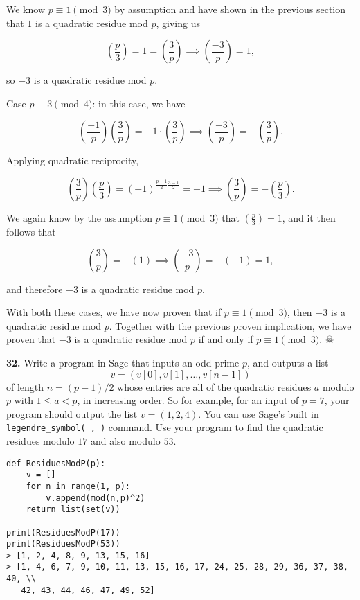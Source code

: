 \documentclass[12pt]{amsart}
\newcommand{\lsym}[2]{\ensuremath{\left(\frac{#1}{#2} \right)}}
\begin{document}
\begin{itemize}
We know $p\equiv 1\pmod{3}$ by assumption and have shown in the previous section that $1$ is a quadratic residue mod $p$, giving us

\[\lsym{p}{3} = 1 = \lsym{3}{p} \implies \lsym{-3}{p} = 1, \]

so $-3$ is a quadratic residue mod $p$.

\bigskip

Case $p\equiv 3\pmod{4}$: in this case, we have 

\[\lsym{-1}{p}\lsym{3}{p} = -1\cdot \lsym{3}{p} \implies \lsym{-3}{p} = -\lsym{3}{p}. \]

Applying quadratic reciprocity,

\[\lsym{3}{p}\lsym{p}{3} = (-1)^{\frac{p-1}{2}\frac{3-1}{2}} = -1\implies \lsym{3}{p} = -\lsym{p}{3}. \]

We again know by the assumption $p\equiv 1\pmod{3}$ that $\lsym{p}{3} = 1$, and it then follows that

\[\lsym{3}{p} = -(1) \implies \lsym{-3}{p} = -(-1) = 1,\]

and therefore $-3$ is a quadratic residue mod $p$.

\medskip

With both these cases, we have now proven that if $p\equiv 1\pmod{3}$, then $-3$ is a quadratic residue mod $p$. Together with the previous proven implication, we have proven that $-3$ is a quadratic residue mod $p$ if and only if $p\equiv 1\pmod{3}$. $\skull$

\end{itemize}

\medskip

{\bf 32.}   Write a program in Sage that inputs an odd prime $p$, and outputs a list 
$$
v=(v[0],v[1],\dots,v[n-1])
$$ 
of length $n=(p-1)/2$ whose entries are all of the quadratic residues $a$ modulo $p$ with $1\leq a<p$, in increasing order.  So for example, for an input of $p=7$, your program should output the list $v=(1,2,4)$.  You can use Sage's built in {\tt legendre\_symbol( , )} command.  Use your program to find the quadratic residues modulo $17$ and also modulo $53$.

\medskip

\begin{verbatim}
def ResiduesModP(p):
    v = []
    for n in range(1, p):
        v.append(mod(n,p)^2)
    return list(set(v))

print(ResiduesModP(17))
print(ResiduesModP(53))
> [1, 2, 4, 8, 9, 13, 15, 16]
> [1, 4, 6, 7, 9, 10, 11, 13, 15, 16, 17, 24, 25, 28, 29, 36, 37, 38, 40, \\
   42, 43, 44, 46, 47, 49, 52]
\end{verbatim}
\end{document}
